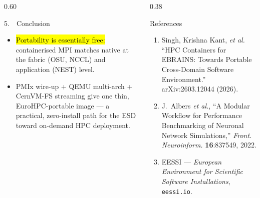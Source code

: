\begin{columns}[T]
  \begin{column}{0.60\textwidth}
    \begin{block}{5.~\ Conclusion}
    \large
    \begin{itemize}
      \item \hl{Portability is essentially free:} containerised MPI matches native at the fabric (OSU, NCCL)
      and application (NEST) level.
      \item {} PMIx wire-up + QEMU multi-arch + CernVM-FS streaming give one thin,
      EuroHPC-portable image --- a practical, zero-install path for the ESD toward on-demand HPC deployment.
    \end{itemize}
    \end{block}
  \end{column}
  \begin{column}{0.38\textwidth}
    \begin{block}{References}
    \small
    \begin{enumerate}
      \item Singh, Krishna Kant, \textit{et al.} ``HPC Containers for EBRAINS: Towards Portable Cross-Domain Software Environment.'' arXiv:2603.12044 (2026).
      \item J.~Albers \textit{et al.}, ``A Modular Workflow for Performance Benchmarking of Neuronal Network Simulations,'' \textit{Front. Neuroinform.} \textbf{16}:837549, 2022.
      \item EESSI --- \textit{European Environment for Scientific Software Installations}, \texttt{eessi.io}.
    \end{enumerate}
    \end{block}
  \end{column}
\end{columns}
